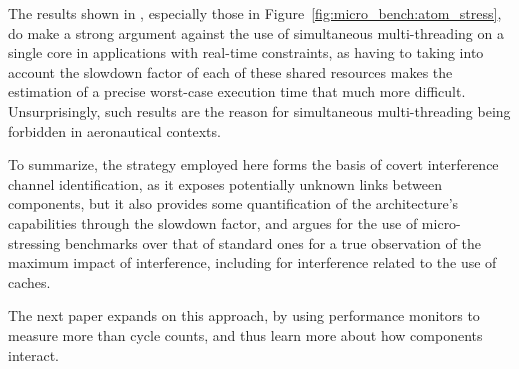 The results shown in \cite{10.1145/2086696.2086713}, especially those in
Figure~\ref{fig:micro_bench:atom_stress}, do make a strong argument against the
use of simultaneous multi-threading on a single core in applications with
real-time constraints, as having to taking into account the slowdown factor of
each of these shared resources makes the estimation of a precise worst-case
execution time that much more difficult. Unsurprisingly, such results are the
reason for simultaneous multi-threading being forbidden in aeronautical
contexts.
\fi

To summarize, the strategy employed here forms the basis of covert interference
channel identification, as it exposes potentially unknown links between
components, but it also provides some quantification of the architecture's
capabilities through the slowdown factor, and argues for the use of
micro-stressing benchmarks over that of standard ones for a true observation of
the maximum impact of interference, including for interference related to the
use of caches.

The next paper expands on this approach, by using performance monitors to
measure more than cycle counts, and thus learn more about how components
interact.

\stopallthesefloats
